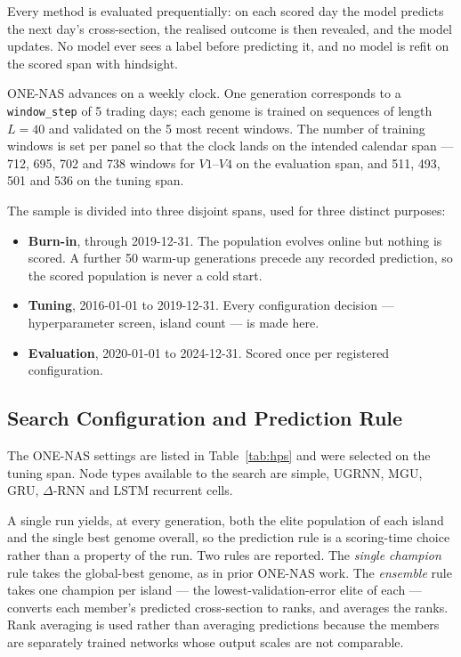 Every method is evaluated prequentially: on each scored day the model
predicts the next day's cross-section, the realised outcome is then
revealed, and the model updates. No model ever sees a label before
predicting it, and no model is refit on the scored span with hindsight.

ONE-NAS advances on a weekly clock. One generation corresponds to a
\texttt{window\_step} of 5 trading days; each genome is trained on
sequences of length $L=40$ and validated on the 5 most recent windows.
The number of training windows is set per panel so that the clock lands on
the intended calendar span --- 712, 695, 702 and 738 windows for
$V1$--$V4$ on the evaluation span, and 511, 493, 501 and 536 on the
tuning span.

The sample is divided into three disjoint spans, used for three distinct
purposes:

\begin{itemize}\itemsep2pt
\item \textbf{Burn-in}, through 2019-12-31. The population evolves online
      but nothing is scored. A further 50 warm-up generations precede any
      recorded prediction, so the scored population is never a cold start.
\item \textbf{Tuning}, 2016-01-01 to 2019-12-31. Every configuration
      decision --- hyperparameter screen, island count --- is made here.
\item \textbf{Evaluation}, 2020-01-01 to 2024-12-31. Scored once per
      registered configuration.
\end{itemize}

\subsection{Search Configuration and Prediction Rule}

The ONE-NAS settings are listed in Table~\ref{tab:hps} and were selected
on the tuning span. Node types available to the search are simple,
UGRNN, MGU, GRU, $\Delta$-RNN and LSTM recurrent cells.

A single run yields, at every generation, both the elite population of
each island and the single best genome overall, so the prediction rule is
a scoring-time choice rather than a property of the run. Two rules are
reported. The \emph{single champion} rule takes the global-best genome, as
in prior ONE-NAS work. The \emph{ensemble} rule takes one champion per
island --- the lowest-validation-error elite of each --- converts each
member's predicted cross-section to ranks, and averages the ranks. Rank
averaging is used rather than averaging predictions because the members
are separately trained networks whose output scales are not comparable.

